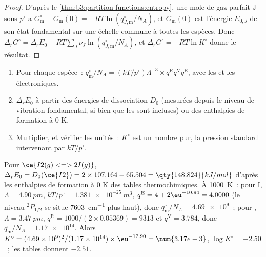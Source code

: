 \begin{proof}
D'après le \cref{thm:b3:partition-functions:entropy}, une mole de gaz
parfait $\mathrm J$ sous $p^\circ$ a
$G^\circ_{\mathrm m} - G_{\mathrm m}(0) = -RT\ln(q^\circ_{J,\mathrm m}/N_A)$, et $G_{\mathrm m}(0)$ est l'énergie $E_{0,J}$
de son état fondamental sur une échelle commune à toutes les espèces.
Donc $\Delta_rG^\circ =
\Delta_rE_0 - RT\sum_J\nu_J\ln(q^\circ_{J,\mathrm m}/N_A)$, et $\Delta_rG^\circ = -RT\ln K^\circ$
donne le résultat.
\end{proof}

\begin{method}\label{met:b3:statistical-thermo-applied:k-stat}
\begin{enumerate}
  \item Pour chaque espèce~: $q^\circ_{\mathrm m}/N_A = (kT/p^\circ)\Lambda^{-3}\times q^{\mathrm R}q^{\mathrm V}q^{\mathrm E}$,
        avec les  et les 
        électroniques.
  \item $\Delta_rE_0$ à partir des énergies de dissociation $D_0$
        (mesurées depuis le niveau de vibration fondamental, si bien que
        les  sont incluses) ou des enthalpies de
        formation à 0 K.
  \item Multiplier, et vérifier les unités~: $K^\circ$ est un nombre pur,
        la pression standard intervenant par $kT/p^\circ$.
\end{enumerate}
\end{method}

\begin{example}\label{ex:b3:statistical-thermo-applied:iodine}
Pour $\ce{I2(g) <=> 2 I(g)}$, $\Delta_rE_0 = D_0(\ce{I2}) = 2 \times 107.164 - 65.504 = \qty{148.824}{kJ/mol}$
d'après les enthalpies de formation à 0 K des tables thermochimiques. À
\qty{1000}{K}~: pour I, $\Lambda = \qty{4.90}{pm}$, $kT/p^\circ = \qty{1.381e-25}{m^3}$, $q^{\mathrm E} = 4 +
2\eu^{-10.94} = 4.0000$ (le niveau ${}^2P_{1/2}$ se situe \qty{7603}{cm^{-1}}
plus haut), donc $q^\circ_{\mathrm m}/N_A = \num{4.69e9}$~;
pour , $\Lambda = \qty{3.47}{pm}$, $q^{\mathrm R} = 1000/(2 \times 0.05369) = 9313$ et $q^{\mathrm V} = 3.784$, donc
$q^\circ_{\mathrm m}/N_A = \num{1.17e14}$. Alors $K^\circ = (4.69\times10^9)^2/(1.17\times10^{14}) \times \eu^{-17.90} =
\num{3.17e-3}$, $\log K^\circ = -2.50$~; les tables donnent $-2.51$.
\end{example}

